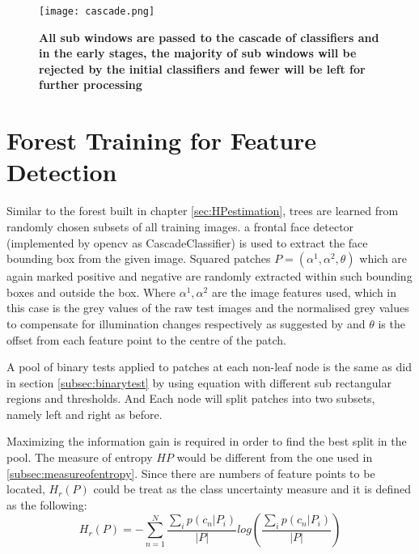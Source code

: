 \begin{figure}
	\centering
	\texttt{[image: cascade.png]}
	\caption[Cascade Rejection]{\label{fig:cascade}}  \textbf{All sub windows are passed to the cascade of classifiers and in the early stages, the majority of sub windows will be rejected by the initial classifiers and fewer will be left for further processing  \cite{facedetect}}
\end{figure}

\newpage
\thispagestyle{plain}
\mbox{}

\section{Forest Training for Feature Detection}
\label{sec:FT}
Similar to the forest built in chapter \ref{sec:HPestimation}, trees are learned from randomly chosen subsets of all training images. a frontal face detector \cite{facedetect}(implemented by opencv as CascadeClassifier) is used to extract the face bounding box from the given image. Squared patches  $P = ( \alpha^{1},\alpha^{2} ,\theta )$ which are again marked positive and negative are randomly extracted within such bounding boxes and outside the box. Where $\alpha^{1}, \alpha^{2}$ are the image features used, which in this case is the grey values of the raw test images and the normalised grey values to compensate for illumination changes respectively as suggested by \cite{2dGFRF} and $\theta$ is the offset from each feature point to the centre of the patch. 

A pool of binary tests applied to patches at each non-leaf node is the same as did in section \ref{subsec:binarytest} by using equation  with different sub rectangular regions and thresholds. And Each node will split patches into two subsets, namely left and right as before.

Maximizing the information gain  is required in order to find the best split in the pool. The measure of entropy $H{P}$ would be different from the one used in \ref{subsec:measureofentropy}. Since there are numbers of feature points to be located, $H_{r}(P)$ could be treat as the class uncertainty measure and it is defined as the following: \cite{2dGFRF}
\begin{equation}
\label{eq:classuncertainty}
H_{r}(P) = -\sum\limits_{n=1}^N \frac{\sum\nolimits_{i}p(c_{n}|P_i)}{|P|}log(\frac{\sum\nolimits_{i}p(c_{n}|P_i)}{|P|})
\end{equation}

